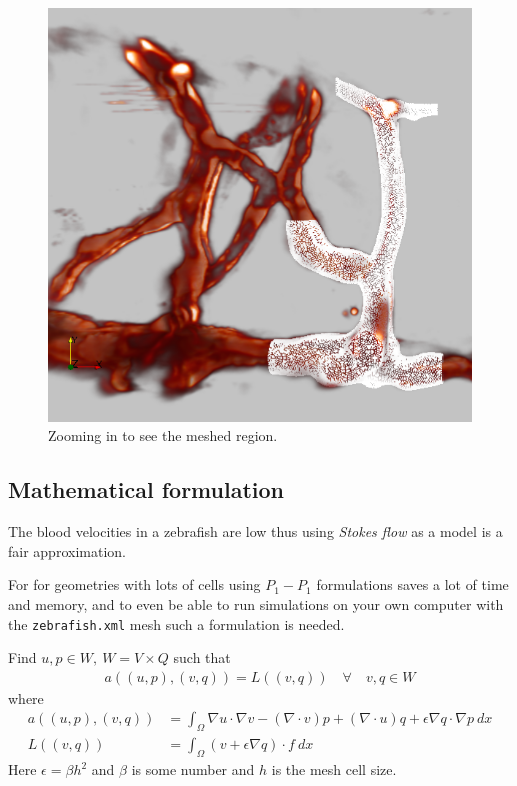 \documentclass[epsfig,11pt]{article}
\begin{document}
\begin{figure}[h!] 
\begin{center}
  \includegraphics[scale=0.3]{zoomed2.png}
  \end{center}
  \caption{Zooming in to see the meshed region.}
\end{figure}

\subsection{Mathematical formulation}

The blood velocities in a zebrafish are low thus using \emph{Stokes flow} as a model is a fair approximation.

For for geometries with lots of cells using $P_1-P_1$ formulations saves a lot of time and memory, and to even be able to run simulations on your own computer with the \texttt{zebrafish.xml} mesh such a formulation is needed. 


 
Find $u,p \in W,\: W = V \times Q $ such that
\begin{align*}
a((u,p),(v,q)) = L((v,q)) \quad \forall \quad v,q \in W 
\end{align*}
where
\begin{align*}
a((u,p),(v,q)) &= \int_\Omega \nabla u \cdot \nabla v - (\nabla \cdot v)p + (\nabla \cdot u)q + \epsilon \nabla q \cdot \nabla p \: dx \\
L((v,q)) &= \int_\Omega  (v + \epsilon \nabla q) \cdot f \: dx
\end{align*}
Here \(\epsilon = \beta h^2\) and \(\beta\) is some number and \(h\) is the mesh cell size.
\end{document}
